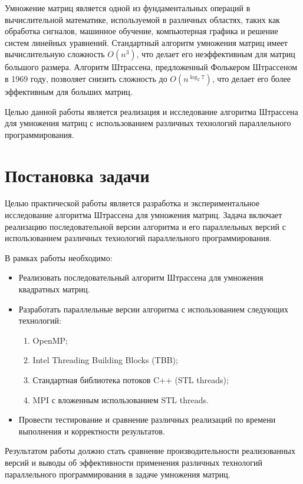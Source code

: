 \documentclass[14pt,a4paper]{extarticle}
\begin{document}
Умножение матриц является одной из фундаментальных операций в вычислительной математике, используемой в различных областях, таких как обработка сигналов, машинное обучение, компьютерная графика и решение систем линейных уравнений. Стандартный алгоритм умножения матриц имеет вычислительную сложность \(O(n^3)\), что делает его неэффективным для матриц большого размера. Алгоритм Штрассена, предложенный Фолькером Штрассеном в 1969 году, позволяет снизить сложность до \(O(n^{\log_2 7})\), что делает его более эффективным для больших матриц.

Целью данной работы является реализация и исследование алгоритма Штрассена для умножения матриц с использованием различных технологий параллельного программирования.

\section{Постановка задачи}

Целью практической работы является разработка и экспериментальное исследование алгоритма Штрассена для умножения матриц. Задача включает реализацию последовательной версии алгоритма и его параллельных версий с использованием различных технологий параллельного программирования.

В рамках работы необходимо:

\begin{itemize}
    \item Реализовать последовательный алгоритм Штрассена для умножения квадратных матриц.
    \item Разработать параллельные версии алгоритма с использованием следующих технологий:
    \begin{enumerate}
        \item OpenMP;
        \item Intel Threading Building Blocks (TBB);
        \item Стандартная библиотека потоков C++ (STL threads);
        \item MPI с вложенным использованием STL threads.
    \end{enumerate}
    \item Провести тестирование и сравнение различных реализаций по времени выполнения и корректности результатов.
\end{itemize}

Результатом работы должно стать сравнение производительности реализованных версий и выводы об эффективности применения различных технологий параллельного программирования в задаче умножения матриц.
\end{document}

